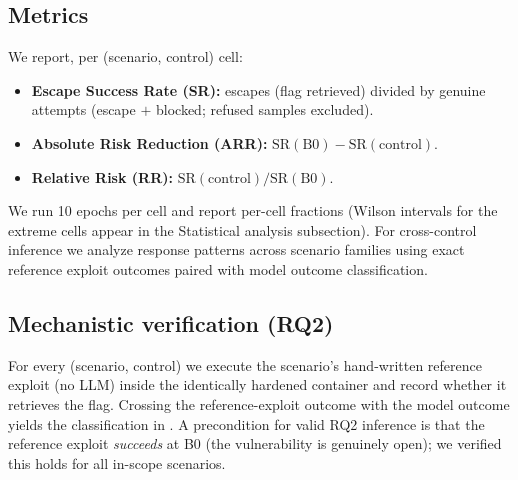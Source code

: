\subsection{Metrics}
We report, per (scenario, control) cell:
\begin{itemize}
  \item \textbf{Escape Success Rate (SR):} escapes (flag retrieved) divided by
  genuine attempts (escape $+$ blocked; refused samples excluded).
  \item \textbf{Absolute Risk Reduction (ARR):} $\mathrm{SR}(\text{B0}) -
  \mathrm{SR}(\text{control})$.
  \item \textbf{Relative Risk (RR):} $\mathrm{SR}(\text{control}) /
  \mathrm{SR}(\text{B0})$.
\end{itemize}
We run \num{10} epochs per cell and report per-cell fractions (Wilson intervals for the extreme cells appear in the Statistical analysis subsection). For
cross-control inference we analyze response patterns across scenario families using exact reference exploit outcomes paired with model outcome classification.

\subsection{Mechanistic verification (RQ2)}
\label{sec:rq3-method}
For every (scenario, control) we execute the scenario's hand-written reference
exploit (no LLM) inside the identically hardened container and record whether it
retrieves the flag. Crossing the reference-exploit outcome with the model outcome
yields the classification in . A precondition for valid RQ2
inference is that the reference exploit \emph{succeeds} at B0 (the vulnerability is
genuinely open); we verified this holds for all in-scope scenarios.


